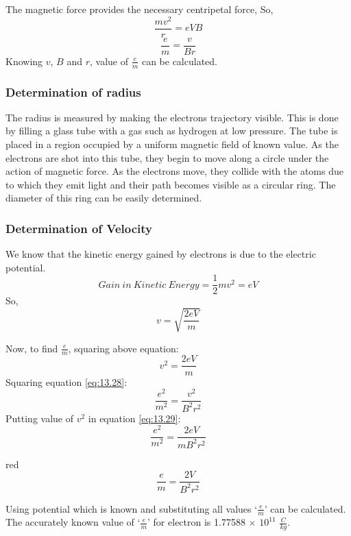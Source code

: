 The magnetic force provides the necessary centripetal force, So,
\begin{equation}\nonumber
    \frac{mv^{2}}{r}=eVB
\end{equation}
\begin{equation}\label{eq:13.28}
    \frac{e}{m}=\frac{v}{Br}
\end{equation}
Knowing $v$, $B$ and $r$, value of $\frac{e}{m}$ can be calculated.
\subsubsection{Determination of radius}
The radius is measured by making the electrons trajectory visible. This is done by filling a glass tube with a gas such as hydrogen at low pressure. The tube is placed in a region occupied by a uniform magnetic field of known value. As the electrons are shot into this tube, they begin to move along a circle under the action of magnetic force. As the electrons move, they collide with the atoms due to which they emit light and their path becomes visible as a circular ring. The diameter of this ring can be easily determined.
\subsubsection{Determination of Velocity}
We know that the kinetic energy gained by electrons is due to the electric potential.
\begin{equation}\nonumber
    Gain\:in\:Kinetic\:Energy= \frac{1}{2} mv^{2} = eV
\end{equation}
So,
\begin{equation}\nonumber
 v=\sqrt{\frac{2eV}{m}}   
\end{equation}

Now, to find $\frac{e}{m}$, squaring above equation:
\begin{equation}\nonumber
 v^{2}=\frac{2eV}{m}   
\end{equation}
Squaring equation \ref{eq:13.28}:
\begin{equation}\label{eq:13.29}
\frac{e^{2}}{m^{2}}=\frac{v^{2}}{B^{2}r^{2}}
\end{equation}
Putting value of $v^{2}$ in equation \ref{eq:13.29}:
\begin{equation}\nonumber
\frac{e^{2}}{m^{2}}=\frac{2e V}{m B^{2}r^{2}}
\end{equation}
\begin{mybox}{red}{}
\begin{equation}\label{eq.13.30}
\frac{e}{m}=\frac{2V}{B^{2}r^{2}}
\end{equation}
\end{mybox}
Using potential which is known and substituting all values ‘$\frac{e}{m}$’ can be calculated. The accurately known value of ‘$\frac{e}{m}$’ for electron is 1.77588 $\times$ $10^{11}$ $\frac{C}{kg}$.

